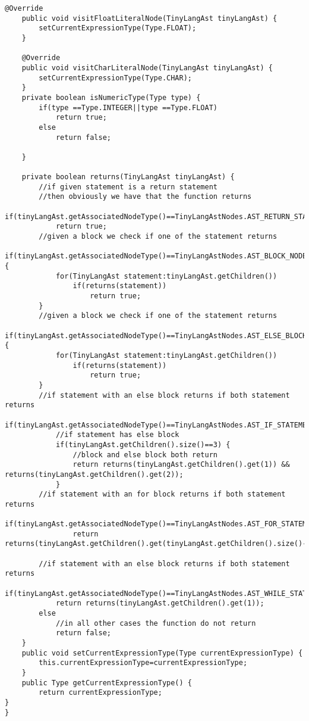 \begin{lstlisting}[basicstyle=\miniscule,caption=Semantic Analyser,label=listing:semanticanalyser]
	@Override
	public void visitFloatLiteralNode(TinyLangAst tinyLangAst) {
		setCurrentExpressionType(Type.FLOAT);		
	}

	@Override
	public void visitCharLiteralNode(TinyLangAst tinyLangAst) {
		setCurrentExpressionType(Type.CHAR);
	}
	private boolean isNumericType(Type type) {
		if(type ==Type.INTEGER||type ==Type.FLOAT)
			return true;
		else 
			return false;
		
	}

	private boolean returns(TinyLangAst tinyLangAst) {
		//if given statement is a return statement 
		//then obviously we have that the function returns
		if(tinyLangAst.getAssociatedNodeType()==TinyLangAstNodes.AST_RETURN_STATEMENT_NODE)
			return true;
		//given a block we check if one of the statement returns
		if(tinyLangAst.getAssociatedNodeType()==TinyLangAstNodes.AST_BLOCK_NODE) { 
			for(TinyLangAst statement:tinyLangAst.getChildren())
				if(returns(statement)) 
					return true;
		}
		//given a block we check if one of the statement returns
		if(tinyLangAst.getAssociatedNodeType()==TinyLangAstNodes.AST_ELSE_BLOCK_NODE) { 
			for(TinyLangAst statement:tinyLangAst.getChildren())
				if(returns(statement)) 
					return true;
		}
		//if statement with an else block returns if both statement returns
		if(tinyLangAst.getAssociatedNodeType()==TinyLangAstNodes.AST_IF_STATEMENT_NODE) 
			//if statement has else block
			if(tinyLangAst.getChildren().size()==3) {
				//block and else block both return
				return returns(tinyLangAst.getChildren().get(1)) && returns(tinyLangAst.getChildren().get(2));
			}		
		//if statement with an for block returns if both statement returns
		if(tinyLangAst.getAssociatedNodeType()==TinyLangAstNodes.AST_FOR_STATEMENT_NODE) 
				return returns(tinyLangAst.getChildren().get(tinyLangAst.getChildren().size()-1));
		
		//if statement with an else block returns if both statement returns
		if(tinyLangAst.getAssociatedNodeType()==TinyLangAstNodes.AST_WHILE_STATEMENT_NODE) 
			return returns(tinyLangAst.getChildren().get(1));
		else
			//in all other cases the function do not return 
			return false;
	}		
	public void setCurrentExpressionType(Type currentExpressionType) {
		this.currentExpressionType=currentExpressionType;
	}
	public Type getCurrentExpressionType() {
		return currentExpressionType;
}
}
\end{lstlisting}





